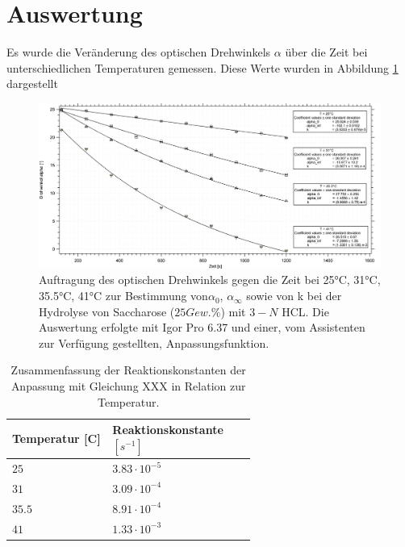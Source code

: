 %
%

\section{Auswertung}

Es wurde die Veränderung des optischen Drehwinkels $\alpha$ über die Zeit bei unterschiedlichen Temperaturen gemessen. Diese Werte wurden in Abbildung \ref{at} dargestellt


\begin{figure}[h]
	\centering	
	\begin{minipage}{1\textwidth}
	\includegraphics[width=\columnwidth]{Bilder/Graph1.png}
	\end{minipage}
		\caption{Auftragung des optischen Drehwinkels gegen die Zeit bei 25°C, 31°C, 35.5°C, 41°C zur Bestimmung von$\alpha_0$, $\alpha_\infty$ sowie von k bei der Hydrolyse von Saccharose ($25 Gew.\%$) mit $3-N$ HCL. Die Auswertung erfolgte mit Igor Pro 6.37 und einer, vom Assistenten zur Verfügung gestellten, Anpassungsfunktion.}
	\label{at}
\end{figure}

\begin{table}[H]
\centering

 
 
 \caption{Zusammenfassung der Reaktionskonstanten der Anpassung mit Gleichung XXX in Relation zur Temperatur.}
\begin{tabular}{L{0.3\linewidth}L{0.3\linewidth}}
Temperatur [\text{\textdegree}C] & Reaktionskonstante $[\si{s}^{-1}]$ \\
\hline \addlinespace[1ex] 
$25$ & $3.83\cdot 10^{-5}$ \\
$31$ & $3.09\cdot 10^{-4}$ \\
$35.5$ & $8.91\cdot 10^{-4}$ \\
$41$ & $1.33\cdot 10^{-3}$ \\
 \end{tabular}
 \label{tab1}
 \end{table}

